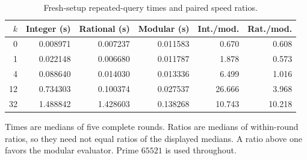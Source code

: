 \begin{table}[htbp]
\centering\small
\caption{Fresh-setup repeated-query times and paired speed ratios.}
\label{tab:arithmetic}
\begin{tabular}{@{}rrrrrr@{}}
\toprule
$k$ & Integer (s) & Rational (s) & Modular (s) & Int./mod. & Rat./mod.\\
\midrule
0 & 0.008971 & 0.007237 & 0.011583 & 0.670 & 0.608\\
1 & 0.022148 & 0.006680 & 0.011787 & 1.878 & 0.573\\
4 & 0.088640 & 0.014030 & 0.013336 & 6.499 & 1.016\\
12 & 0.734303 & 0.100374 & 0.027537 & 26.666 & 3.968\\
32 & 1.488842 & 1.428603 & 0.138268 & 10.743 & 10.218\\
\bottomrule
\end{tabular}
\par\smallskip\begin{minipage}{0.97\textwidth}\footnotesize
Times are medians of five complete rounds. Ratios are medians of within-round ratios, so they need not equal ratios of the displayed medians. A ratio above one favors the modular evaluator. Prime $65521$ is used throughout.
\end{minipage}
\end{table}
